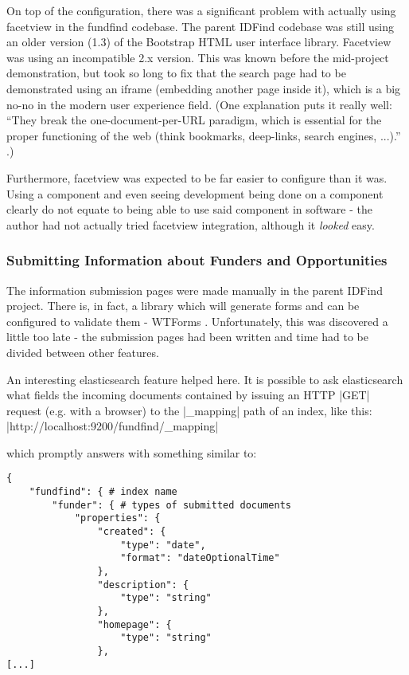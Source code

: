 

On top of the configuration, there was a significant problem with actually using facetview in the fundfind codebase. The parent IDFind codebase was still using an older version (1.3) of the Bootstrap HTML user interface library. Facetview was using an incompatible 2.x version. This was known before the mid-project demonstration, but took so long to fix that the search page had to be demonstrated using an iframe (embedding another page inside it), which is a big no-no in the modern user experience field. (One explanation puts it really well: ``They break the one-document-per-URL paradigm, which is essential for the proper functioning of the web (think bookmarks, deep-links, search engines, ...).'' \cite{iframe-evil}.)

Furthermore, facetview was expected to be far easier to configure than it was. Using a component and even seeing development being done on a component clearly do not equate to being able to use said component in software - the author had not actually tried facetview integration, although it \emph{looked} easy.

\subsubsection{Submitting Information about Funders and Opportunities}
\label{impl-submitting}

The information submission pages were made manually in the parent IDFind project. There is, in fact, a library which will generate forms and can be configured to validate them - WTForms \cite{wtforms}. Unfortunately, this was discovered a little too late - the submission pages had been written and time had to be divided between other features.

An interesting elasticsearch feature helped here. It is possible to ask elasticsearch what fields the incoming documents contained by issuing an HTTP |GET| request (e.g. with a browser) to the |_mapping| path of an index, like this:
\\ |http://localhost:9200/fundfind/_mapping|

which promptly answers with something similar to:
\begin{verbatim}
{
	"fundfind": { # index name
		"funder": { # types of submitted documents
			"properties": {
				"created": {
					"type": "date",
					"format": "dateOptionalTime"
				},
				"description": {
					"type": "string"
				},
				"homepage": {
					"type": "string"
				},
[...]
\end{verbatim}

